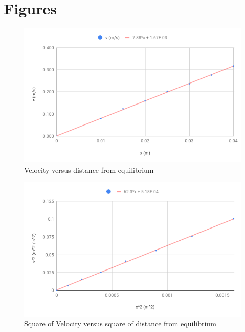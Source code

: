 \section{Figures}
\FloatBarrier
\begin{figure}[ht]
    \centering
    \includegraphics[scale=0.71]{image/06-kinetic/v.png}
    \caption{Velocity versus distance from equilibrium}
    \label{figure:06.v}
\end{figure}
\begin{figure}[ht]
    \centering
    \includegraphics[scale=0.71]{image/06-kinetic/v2.png}
    \caption{Square of Velocity versus square of distance from equilibrium}
    \label{figure:06.v.2}
\end{figure}
